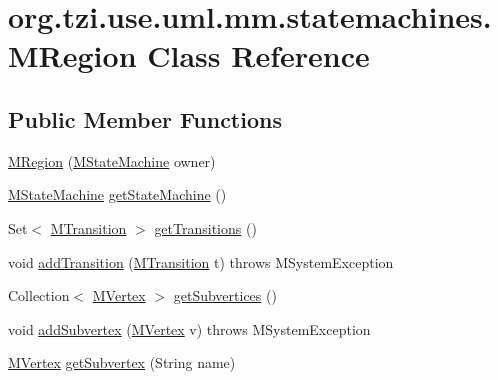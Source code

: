 \hypertarget{classorg_1_1tzi_1_1use_1_1uml_1_1mm_1_1statemachines_1_1_m_region}{\section{org.\-tzi.\-use.\-uml.\-mm.\-statemachines.\-M\-Region Class Reference}
\label{classorg_1_1tzi_1_1use_1_1uml_1_1mm_1_1statemachines_1_1_m_region}
}
\subsection*{Public Member Functions}
\begin{DoxyCompactItemize}
\item 
\hyperlink{classorg_1_1tzi_1_1use_1_1uml_1_1mm_1_1statemachines_1_1_m_region_a66c6763b733a841cd4d24e090a3af462}{M\-Region} (\hyperlink{classorg_1_1tzi_1_1use_1_1uml_1_1mm_1_1statemachines_1_1_m_state_machine}{M\-State\-Machine} owner)
\item 
\hyperlink{classorg_1_1tzi_1_1use_1_1uml_1_1mm_1_1statemachines_1_1_m_state_machine}{M\-State\-Machine} \hyperlink{classorg_1_1tzi_1_1use_1_1uml_1_1mm_1_1statemachines_1_1_m_region_af37eb9e1a2a6177c698b3cb1776e447e}{get\-State\-Machine} ()
\item 
Set$<$ \hyperlink{classorg_1_1tzi_1_1use_1_1uml_1_1mm_1_1statemachines_1_1_m_transition}{M\-Transition} $>$ \hyperlink{classorg_1_1tzi_1_1use_1_1uml_1_1mm_1_1statemachines_1_1_m_region_a64df5151d74a98fd55bab19e989d0adf}{get\-Transitions} ()
\item 
void \hyperlink{classorg_1_1tzi_1_1use_1_1uml_1_1mm_1_1statemachines_1_1_m_region_ad43fc651ba2bc75726d990ab98b2f218}{add\-Transition} (\hyperlink{classorg_1_1tzi_1_1use_1_1uml_1_1mm_1_1statemachines_1_1_m_transition}{M\-Transition} t)  throws M\-System\-Exception 
\item 
Collection$<$ \hyperlink{classorg_1_1tzi_1_1use_1_1uml_1_1mm_1_1statemachines_1_1_m_vertex}{M\-Vertex} $>$ \hyperlink{classorg_1_1tzi_1_1use_1_1uml_1_1mm_1_1statemachines_1_1_m_region_a56f364f63104fb81f3537540c1bd475a}{get\-Subvertices} ()
\item 
void \hyperlink{classorg_1_1tzi_1_1use_1_1uml_1_1mm_1_1statemachines_1_1_m_region_a0e7bd0fa534b9303fdd69df42524695e}{add\-Subvertex} (\hyperlink{classorg_1_1tzi_1_1use_1_1uml_1_1mm_1_1statemachines_1_1_m_vertex}{M\-Vertex} v)  throws M\-System\-Exception 
\item 
\hyperlink{classorg_1_1tzi_1_1use_1_1uml_1_1mm_1_1statemachines_1_1_m_vertex}{M\-Vertex} \hyperlink{classorg_1_1tzi_1_1use_1_1uml_1_1mm_1_1statemachines_1_1_m_region_a723ead4ddff4f56a6f309f1e18f9c6ad}{get\-Subvertex} (String name)

\end{DoxyCompactItemize}
